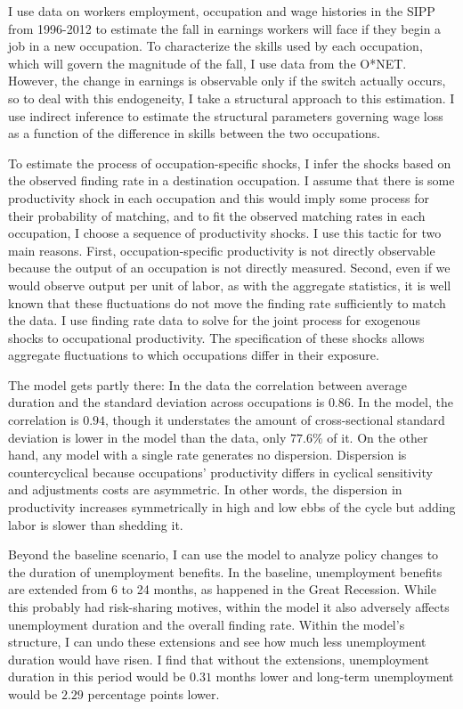 \documentclass[12pt]{article}
\newcommand{\highlightPP}[1]{{\emph{\color{MyPurple}{#1}}}}
\theoremstyle{definition}
\begin{document}
I use data on workers employment, occupation and wage histories in the SIPP from 1996-2012 to estimate the fall in earnings workers will face if they begin a job in a new occupation. To characterize the skills used by each occupation, which will govern the magnitude of the fall, I use data from the O*NET. However, the change in earnings is observable only if the switch actually occurs, so to deal with this endogeneity, I take a structural approach to this estimation. I use indirect inference to estimate the structural parameters governing wage loss as a function of the difference in skills between the two occupations.

To estimate the process of occupation-specific shocks, I infer the shocks based on the observed finding rate in a destination occupation. I assume that there is some productivity shock in each occupation and this would imply some process for their probability of matching, and to fit the observed matching rates in each occupation, I choose a sequence of productivity shocks. I use this tactic for two main reasons. First, occupation-specific productivity is not directly observable because the output of an occupation is not directly measured. Second, even if we would observe output per unit of labor, as with the aggregate statistics, it is well known that these fluctuations do not move the finding rate sufficiently to match the data. I use finding rate data to solve for the joint process for exogenous shocks to occupational productivity. The specification of these shocks allows aggregate fluctuations to which occupations differ in their exposure.

\highlightPP{An important factor to consider for realistic long-term unemployment is that the cross-sectional standard deviation of duration is significant and counter-cyclical.} The model gets partly there: In the data the correlation between average duration and the standard deviation across occupations is $0.86$. In the model, the correlation is $0.94$, though it understates the amount of cross-sectional standard deviation is lower in the model than the data, only $77.6\%$ of it. On the other hand, any model with a single rate generates no dispersion. Dispersion is countercyclical because occupations' productivity differs in cyclical sensitivity and adjustments costs are asymmetric. In other words, the dispersion in productivity increases symmetrically in high and low ebbs of the cycle but adding labor is slower than shedding it.

Beyond the baseline scenario, I can use the model to analyze policy changes to the duration of unemployment benefits. In the baseline, unemployment benefits are extended from 6 to 24 months, as happened in the Great Recession. While this probably had risk-sharing motives, within the model it also adversely affects unemployment duration and the overall finding rate. Within the model's structure, I can undo these extensions and see how much less unemployment duration would have risen. I find that without the extensions, unemployment duration in this period would be $0.31$ months lower and long-term unemployment would be $2.29$ percentage points lower.
\end{document}
